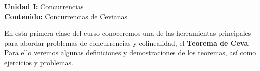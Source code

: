 {\Large
    \textbf{Unidad I:} Concurrencias\vspace{2mm}\\
    \textbf{Contenido:} Concurrencias de Cevianas
}

En esta primera clase del curso conoceremos una de las herramientas principales para abordar problemas de concurrencias y colinealidad, el \textbf{Teorema de Ceva}.
Para ello veremos algunas definiciones y demostraciones de los teoremas, así como ejercicios y problemas.
